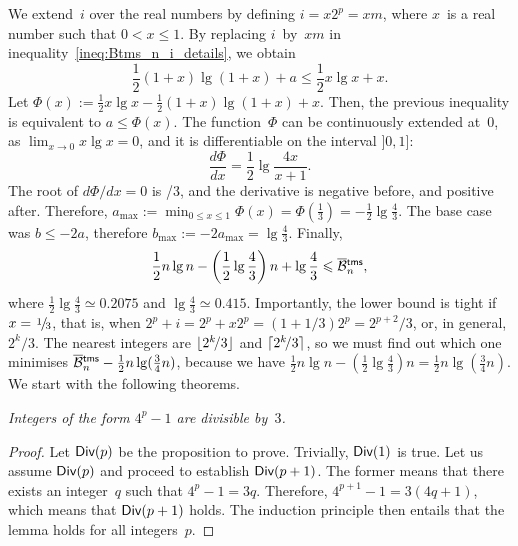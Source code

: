 We extend~\(i\) over the real numbers by defining \(i=x2^p=xm\), where
\(x\)~is a real number such that \(0 < x \leqslant 1\). By replacing
\(i\)~by~\(xm\) in inequality~\eqref{ineq:Btms_n_i_details}, we obtain
\begin{equation*}
\frac{1}{2}(1+x)\lg(1+x) + a \leqslant \frac{1}{2}x\lg x + x.
\end{equation*}
Let \(\Phi(x) := \tfrac{1}{2}x\lg x - \tfrac{1}{2}(1+x)\lg(1+x) +
x\). Then, the previous inequality is equivalent to \(a \leqslant
\Phi(x)\). The function~\(\Phi\) can be continuously extended
at~\(0\), as \(\lim_{x \to 0} x\lg x = 0\), and it is differentiable
on the interval \(]0,1]\):
\begin{equation}
\frac{d\Phi}{dx} = \frac{1}{2}\lg\frac{4x}{x+1}.
\label{eq:der_Phi}
\end{equation}
The root of \(d\Phi/dx = 0\) is /{3}, and the derivative
is negative before, and positive after. Therefore, \(a_{\max} :=
\min_{0 \leqslant x \leqslant 1}\Phi(x) = \Phi(\tfrac{1}{3}) =
-\tfrac{1}{2}\lg\tfrac{4}{3}\). The base case was \(b \leqslant -2a\),
therefore \(b_{\max} := -2a_{\max} = \lg\tfrac{4}{3}\). Finally,
\begin{equation}
  \frac{1}{2}n\lg n - \left(\frac{1}{2}\lg\frac{4}{3}\right)n + \lg\frac{4}{3}
  \leqslant \OB{\fun{tms}}{n},
\label{ineq:lower_Btms}
\end{equation}
where \(\tfrac{1}{2}\lg\tfrac{4}{3} \simeq 0.2075\) and
\(\lg\tfrac{4}{3} \simeq 0.415\). Importantly, the lower bound is
tight if \(x=\myfrac{1}/{3}\), that is, when
\(2^p+i=2^p+x2^p=(1+1/3)2^p=2^{p+2}\!/3\), or, in general,
\(2^k\!/3\). The nearest integers are \(\lfloor{2^k\!/3}\rfloor\) and
\(\lceil{2^k\!/3}\rceil\), so we must find out which one minimises
\(\OB{\fun{tms}}{n} - \tfrac{1}{2}n\lg(\tfrac{3}{4}n)\), because we
have \(\tfrac{1}{2}n\lg n - \left(\tfrac{1}{2}\lg\tfrac{4}{3}\right)n
= \tfrac{1}{2}n\lg(\tfrac{3}{4}n)\). We start with the following
theorems.
\begin{lemma}
\label{lem:div3}
\textsl{Integers of the form \(4^p-1\) are divisible by~\(3\).}
\end{lemma}
\begin{proof}
  Let \(\textsf{Div}({p})\) be the proposition
  to prove. Trivially, \(\textsf{Div}({1})\) is true. Let us assume
  \(\textsf{Div}({p})\) and proceed to establish \(\textsf{Div}({p+1})\). The
  former means that there exists an integer~\(q\) such that \(4^p - 1
  = 3q\). Therefore, \(4^{p+1} - 1 = 3(4q+1)\), which means that
  \(\textsf{Div}({p+1})\) holds. The induction principle then entails that
  the lemma holds for all integers~\(p\).
\end{proof}
